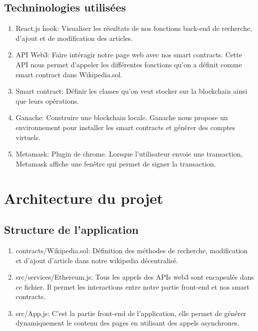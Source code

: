 \documentclass[14px]{article}
\begin{document}
	\subsection{Techninologies utilisées}
	\begin{enumerate}
		\item React.js hook: Visualiser les résultats de nos fonctions back-end de recherche, d'ajout et de modification des articles.
		\item API Web3: Faire intéragir notre page web avec nos smart contracts. Cette API nous permet d'appeler les différentes fonctions  qu'on a définit comme smart contract dans Wikipedia.sol.
		\item Smart contract: Définir les classes qu'on veut stocker sur la blockchain ainsi que leurs opérations. 
		\item Ganache: Construire une blockchain locale. Ganache nous propose un environnement pour installer les smart contracts et générer des comptes virtuels.
		\item Metamask: Plugin de chrome. Lorsque l'utilisateur envoie une transaction, Metamask affiche une fenêtre qui permet de signer la transaction.
	\end{enumerate}
	
	\clearpage
	\pagestyle{fancy}
	\rhead{\thepage}
	\fancyfoot{}
	\section{Architecture du projet}
	\subsection{Structure de l'application}
		\begin{enumerate}
		\item contracts/Wikipedia.sol: Définition des méthodes de recherche, modification et d'ajout d'article dans notre wikipedia décentralisé.
		\item src/services/Ethereum.js: Tous les appels des APIs web3 sont encapsulés dans ce fichier. Il permet les interactions entre notre partie front-end et nos smart contracts.
		\item src/App.js: C'est la partie front-end de l'application, elle permet de générer dynamiquement le contenu des pages en utilisant des appels asynchrones.
		\end{enumerate}
	
	
	\clearpage
	\pagestyle{fancy}
	\rhead{\thepage}
	\fancyfoot{}
\end{document}
